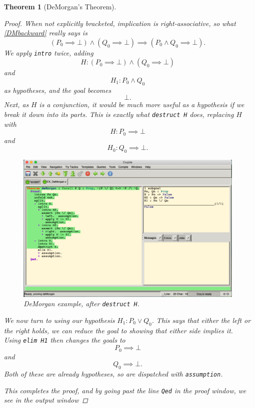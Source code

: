 \documentclass[12pt,notitlepage]{report}
\theoremstyle{plain}
\newtheorem{theo}{Theorem}[section]
\theoremstyle{definition}
\numberwithin{equation}{section}
\begin{document}
\begin{theo}[DeMorgan's Theorem]
\begin{proof}
        \par \medskip
        When not explicitly bracketed, implication is right-associative, so what \eqref{DMbackward} really says is
        \[
            (P_0 \implies \bot) \land (Q_0 \implies \bot) \implies (P_0 \land Q_0 \implies \bot).
        \]
        We apply \texttt{intro} twice, adding
        \[
            H : (P_0 \implies \bot) \land (Q_0 \implies \bot)
        \]
        and
        \[
            H_1 : P_0 \land Q_0
        \]
        as hypotheses, and the goal becomes
        \[
            \bot.
        \]
        Next, as $H$ is a conjunction, it would be much more useful as a hypothesis if we break it down into its parts.  This is exactly what \texttt{destruct H} does, replacing $H$ with
        \[
            H : P_0 \implies \bot
        \]
        and
        \[
            H_0 : Q_0 \implies \bot.
        \]
        \par \medskip
          \noindent
\begin{figure}[H]
    \centering
          \includegraphics[scale=0.45]{DeMorgan7}
              \caption{DeMorgan example, after \texttt{destruct H}.}
    \label{fig:demorgan1}
\end{figure}
        \par \medskip
        We now turn to using our hypothesis $H_1 : P_0 \lor Q_0$.  This says that either the left or the right holds, we can reduce the goal to showing that either side implies it.  Using \texttt{elim H1} then changes the goals to
        \[
            P_0 \implies \bot
        \]
        and
        \[ 
            Q_0 \implies \bot.
        \]
        Both of these are already hypotheses, so are dispatched with \texttt{assumption}.
        \par This completes the proof, and by going past the line \texttt{Qed} in the proof window, we see in the output window

\end{proof}
\end{theo}
\end{document}
